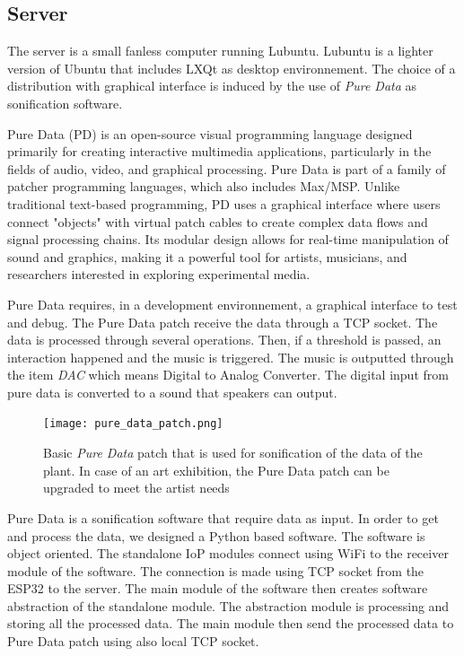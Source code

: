 \subsection{Server}

The server is a small fanless computer running Lubuntu. Lubuntu is a lighter version of Ubuntu
that includes LXQt as desktop environnement. The choice of a distribution with graphical
interface is induced by the use of \textit{Pure Data} as sonification software.

Pure Data (PD) is an open-source visual programming language designed primarily for creating interactive multimedia applications, particularly in the fields of audio, video, and graphical processing.
Pure Data is part of a family of patcher programming languages, which also includes Max/MSP.
Unlike traditional text-based programming, PD uses a graphical interface where users connect 
"objects" with virtual patch cables to create complex data flows and signal processing chains. 
Its modular design allows for real-time manipulation of sound and graphics, making it a powerful 
tool for artists, musicians, and researchers interested in exploring experimental media. 

Pure Data requires, in a development environnement, a graphical interface to test and debug.
The Pure Data patch receive the data through a TCP socket. The data is processed through several 
operations. Then, if a threshold is passed, an interaction happened and the music is triggered.
The music is outputted through the item \textit{DAC} which means Digital to Analog Converter. 
The digital input from pure data is converted to a sound that speakers can output.

\begin{figure}[h]
    \centering
    \texttt{[image: pure\_data\_patch.png]}
    \caption{Basic \textit{Pure Data} patch that is used for sonification of the data
    of the plant. In case of an art exhibition, the Pure Data patch can be upgraded to meet the
    artist needs} 
    \vspace{0.1cm}
    \label{fig:pure_data_patch}
\end{figure}


Pure Data is a sonification software that require data as input. In order to get and process the data,
we designed a Python based software. %
The software is object oriented. The standalone IoP modules connect using WiFi to the receiver module
of the software. The connection is made using TCP socket from the ESP32 to the server.
The main module of the software then creates software abstraction of the standalone module. 
The abstraction module is processing and storing all the processed data.
The main module then send the processed data to Pure Data patch using also local TCP socket.

